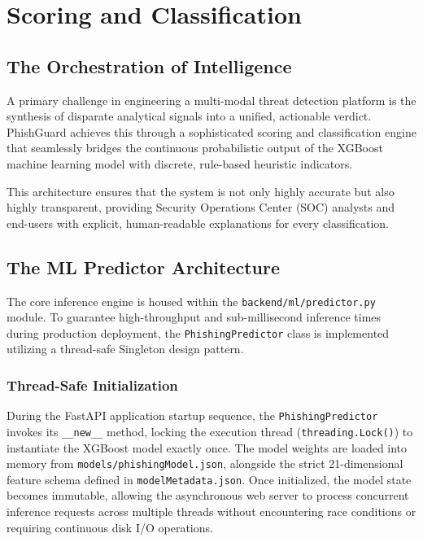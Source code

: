 \chapter{Scoring and
Classification}
\label{chapter-7-scoring-and-classification}

\section{The Orchestration of
Intelligence}\label{the-orchestration-of-intelligence}

A primary challenge in engineering a multi-modal threat detection
platform is the synthesis of disparate analytical signals into a
unified, actionable verdict. PhishGuard achieves this through a
sophisticated scoring and classification engine that seamlessly bridges
the continuous probabilistic output of the XGBoost machine learning
model with discrete, rule-based heuristic indicators.

This architecture ensures that the system is not only highly accurate
but also highly transparent, providing Security Operations Center (SOC)
analysts and end-users with explicit, human-readable explanations for
every classification.

\section{The ML Predictor
Architecture}\label{the-ml-predictor-architecture}

The core inference engine is housed within the
\texttt{backend/ml/predictor.py} module. To guarantee high-throughput
and sub-millisecond inference times during production deployment, the
\texttt{PhishingPredictor} class is implemented utilizing a thread-safe
Singleton design pattern.

\subsection{Thread-Safe
Initialization}\label{thread-safe-initialization}

During the FastAPI application startup sequence, the
\texttt{PhishingPredictor} invokes its \texttt{\_\_new\_\_} method,
locking the execution thread (\texttt{threading.Lock()}) to instantiate
the XGBoost model exactly once. The model weights are loaded into memory
from \texttt{models/phishingModel.json}, alongside the strict
21-dimensional feature schema defined in \texttt{modelMetadata.json}.
Once initialized, the model state becomes immutable, allowing the
asynchronous web server to process concurrent inference requests across
multiple threads without encountering race conditions or requiring
continuous disk I/O operations.


